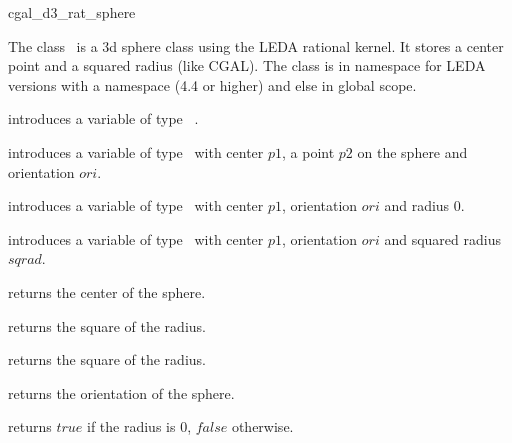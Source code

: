 \ccDefGlobalScope{}
\begin{ccRefClass}{cgal_d3_rat_sphere}

\ccDefinition


The class \ccRefName\  is a 3d sphere class using the LEDA rational kernel. It stores a center point
and a squared radius (like CGAL). The class is in namespace  for LEDA versions with a namespace
(4.4 or higher) and else in global scope.



\ccCreation

{introduces a variable of type \ccRefName\ .} 
  
{introduces a variable of type \ccRefName\ with center $p1$, a point
$p2$ on the sphere and orientation $ori$. }		  
  
{introduces a variable of type \ccRefName\ with center $p1$, orientation $ori$
and radius $0$.}	
  
{introduces a variable of type \ccRefName\ with center $p1$, orientation $ori$
and squared radius $sqrad$.}	 


\ccOperations

{returns the center of the sphere.}  
  
{returns the square of the radius.} 

{returns the square of the radius.} 
  
{returns the orientation of the sphere.}  
  
{returns $true$ if the radius is 0, $false$ otherwise.} 

\end{ccRefClass} 
